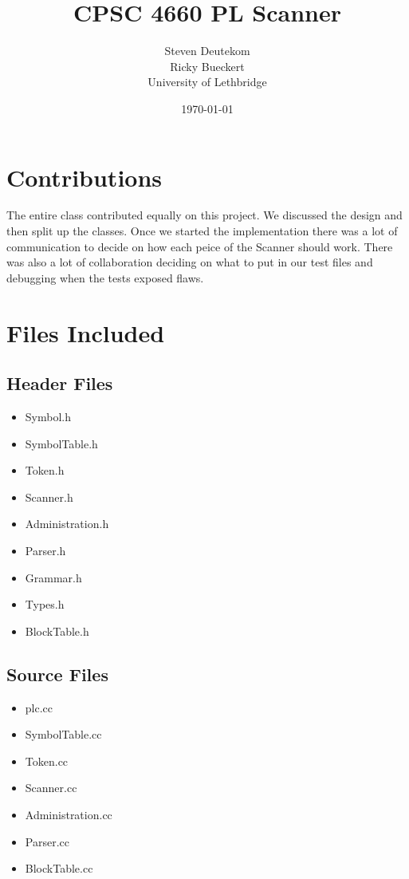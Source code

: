 \documentclass{article}
\begin{document}
\title{CPSC 4660 PL Scanner}
\author{Steven Deutekom\\
	Ricky Bueckert\\
	University of Lethbridge}
\date{\today}

\maketitle

\section{Contributions}
The entire class contributed equally on this project. We discussed the design and then split up the classes. Once we started the implementation there was a lot of communication to decide on how each peice of the Scanner should work. There was also a lot of collaboration deciding on what to put in our test files and debugging when the tests exposed flaws.

\section{Files Included}

\subsection{Header Files}
\begin{itemize}
	\item Symbol.h
	\item SymbolTable.h
	\item Token.h
	\item Scanner.h
	\item Administration.h
  \item Parser.h
  \item Grammar.h
  \item Types.h
  \item BlockTable.h
\end{itemize}

\subsection{Source Files}
\begin{itemize}
	\item plc.cc
	\item SymbolTable.cc
	\item Token.cc
	\item Scanner.cc
	\item Administration.cc
  \item Parser.cc
  \item BlockTable.cc
\end{itemize}
\end{document}

